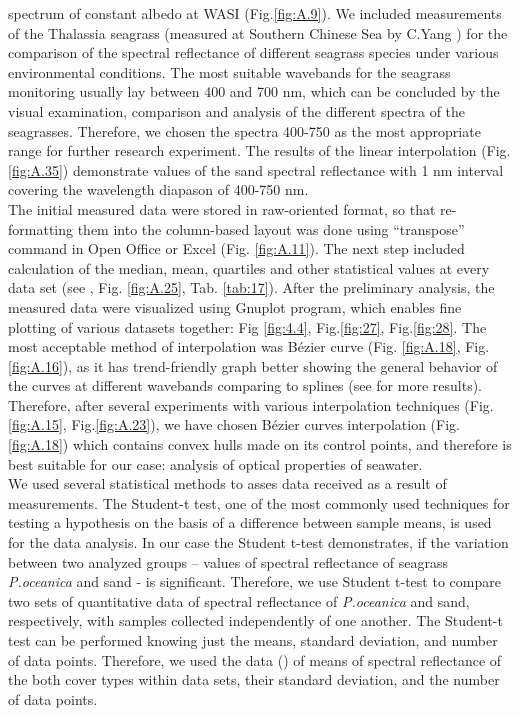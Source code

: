 \documentclass[11pt]{article}
\begin{document}
spectrum of constant albedo at \ac{WASI} (Fig.\ref{fig:A.9}). 
We included measurements of the Thalassia seagrass
(measured at Southern Chinese Sea by C.Yang \cite{Yang10} \label{Yang10}) for the comparison of the spectral reflectance of
different seagrass species under various environmental conditions.
The most suitable wavebands for the seagrass monitoring usually lay between 400 and 700 nm,
which can be concluded by the visual examination, comparison and analysis of the different spectra of
the seagrasses. Therefore, we chosen the spectra 400-750 as the most appropriate range for
further research experiment. The results of the linear interpolation (Fig.\ref{fig:A.35}) demonstrate values of the
sand spectral reflectance with 1 nm interval covering the wavelength diapason of 400-750 nm.\\
The initial measured data were stored in raw-oriented format, so that re-formatting them into the
column-based layout was done using “transpose” command in Open Office or Excel (Fig. \ref{fig:A.11}). The next step included
calculation of the median, mean, quartiles and other statistical values at every data set (see ,\label{dataprep} Fig. \ref{fig:A.25}, Tab. \ref{tab:17}).
After the preliminary analysis, the measured data were visualized using Gnuplot program, which
enables fine plotting of various datasets together: Fig \ref{fig:4.4}, Fig.\ref{fig:27}, Fig.\ref{fig:28}. The most acceptable method of interpolation was B\'ezier curve (Fig. \ref{fig:A.18}, Fig. \ref{fig:A.16}),
as it has trend-friendly graph better showing the general behavior of the curves at different wavebands
comparing to splines (see  for more results). 
Therefore, after several experiments with various interpolation techniques (Fig.\ref{fig:A.15}, Fig.\ref{fig:A.23}), we have chosen B\'ezier curves interpolation (Fig.\ref{fig:A.18}) which contains convex hulls made on its control points, and therefore is best suitable for our case: analysis of optical
properties of seawater.\\
We used several statistical methods to asses data received as a result of measurements. 
The Student-t test,
one of the most commonly used techniques for testing a hypothesis on the basis
of a difference between sample means, is used for the data analysis. In our case the Student t-test demonstrates, if the variation
between two analyzed groups – values of spectral reflectance of seagrass \textit{P.oceanica} and sand - is
significant. Therefore, we use Student t-test to compare two sets of quantitative data of spectral
reflectance of \textit{P.oceanica} and sand, respectively, with samples collected independently of one
another. The Student-t test can be performed knowing just the means, standard deviation, and number
of data points. Therefore, we used the data () of means of spectral reflectance of the both
 cover types within data sets, their standard deviation, and the number of data points.
\end{document}
